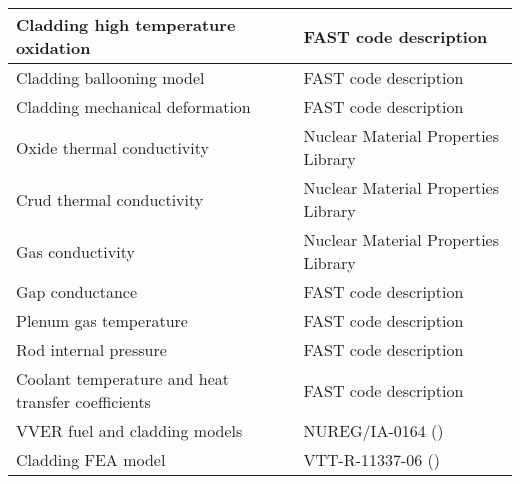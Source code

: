 \begin{longtable}{|m{8.0cm} | m{7.0cm}|}
            Cladding high temperature oxidation 			        &					 FAST code description                      	    \\\hline
            Cladding ballooning model 						        &					 FAST code description		                        \\\hline
            Cladding mechanical deformation 				        &					 FAST code description			                    \\\hline
            Oxide thermal conductivity 						        &					 Nuclear Material Properties Library			    \\\hline
            Crud thermal conductivity 						        &					 Nuclear Material Properties Library			    \\\hline
            Gas conductivity 								        &					 Nuclear Material Properties Library			    \\\hline
            Gap conductance 								        &					 FAST code description			                    \\\hline
            Plenum gas temperature 							        &					 FAST code description			                    \\\hline
            Rod internal pressure 							        &					 FAST code description			                    \\\hline
            Coolant temperature and heat transfer coefficients 		&					 FAST code description			                    \\\hline
            VVER fuel and cladding models 							&					 NUREG/IA-0164 (\cite{ref:Shestopalov1999a})		\\\hline
            Cladding FEA model 										&					 VTT-R-11337-06 (\cite{ref:Knuutila2006a})	        \\\hline
  \end{longtable}
